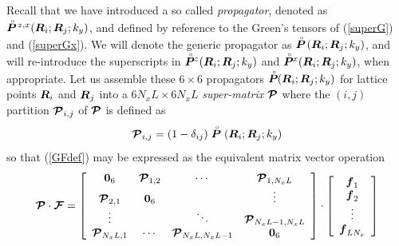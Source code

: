 Recall that we have introduced a so called {\em propagator\/}, denoted as 
$\rf{\bmi P}\!{}^{z,x}({\bmi 
R}_{i};{\bmi R}_{j};k_y)$, and defined by reference to the Green's 
tensors of (\ref{superG}) and (\ref{superGx}). We will denote the generic 
propagator as $\rf{\bmi P}\!({\bmi 
R}_{i};{\bmi R}_{j};k_y)$, and will re-introduce the superscripts in 
$\rf{\bmi P}\!\!{}^{z}({\bmi 
R}_{i};{\bmi R}_{j};k_y)$ and $\rf{\bmi P}\!\!{}^{x}({\bmi 
R}_{i};{\bmi R}_{j};k_y)$, when appropriate.
Let us assemble these $6 \times 6$ propagators $\rf{\bmi P}\!\!({\bmi 
R}_{i};{\bmi R}_{j};k_y)$  for lattice points ${\bmi R}_{i}$ and ${\bmi 
R}_{j}$ into a $6 {N}_{x} L \times 6  {N}_{x} L$ {\em super-matrix\/} 
${\CB P}$ 
where the $(i, j)$ partition ${\CB P}_{i,j}$ of ${\CB P}$ is defined as
\begin{equation} \label{Gijdef}
{\CB P}_{i,j}=(1-{\delta }_{ij})\rf{\bmi P}({\bmi R}_{i};{\bmi 
R}_{j};k_y)
\end{equation}
so that  (\ref{GFdef}) may be expressed as the equivalent matrix vector operation
\begin{equation} \label{CBGdef}
{\CB P}\cdot{\CB F}=\left[{\begin{array}{cccc}
{\bf 0}_6&{\CB P}_{1,2}&\cdots &{\CB P}_{1,{N}_{x} L}\\
{\CB P}_{2,1}&{\bf 0}_6&&\vdots\\
\vdots&&\ddots&{\CB P}_{{N}_{x} L-1,{N}_{x} L}\\
{\CB P}_{{N}_{x} L,1}&\cdots &{\CB P}_{{N}_{x} L,{N}_{x} L-1}&{\bf 0}_6\end{array}}\right]
\cdot\left[\begin{array}{c} {\bmi f}_1\\
{\bmi f}_2\\\vdots\\{\bmi f}_{L N_x}    \end{array}\right]
\end{equation}

